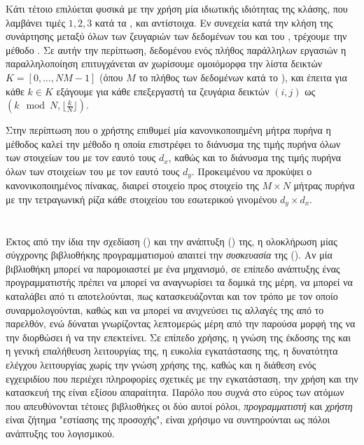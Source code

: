 Κάτι τέτοιο επιλύεται φυσικά με την χρήση μία ιδιωτικής ιδιότητας \texttt{} της κλάσης, που λαμβάνει τιμές $1, 2, 3$ κατά τα \texttt{}, \texttt{} και \texttt{} αντίστοιχα.
Εν συνεχεία κατά την κλήση της συνάρτησης \texttt{} μεταξύ όλων των ζευγαριών των δεδομένων του \texttt{} και του \texttt{}, τρέχουμε την μέθοδο \texttt{}.
Σε αυτήν την περίπτωση, δεδομένου ενός πλήθος παράλληλων εργασιών \texttt{} η παραλληλοποίηση επιτυγχάνεται αν χωρίσουμε ομοιόμορφα την λίστα δεικτών $K = [0, \dots, Ν Μ - 1]$ (όπου $Μ$ το πλήθος των δεδομένων κατά το \texttt{}), και έπειτα για κάθε $k \in K$ εξάγουμε για κάθε επεξεργαστή τα ζευγάρια δεικτών $(i,j)$ ως $(k\mod N, \lfloor \frac{k}{N} \rfloor)$.\par
Στην περίπτωση που ο χρήστης επιθυμεί μία κανονικοποιημένη μήτρα πυρήνα η μέθοδος \texttt{} καλεί την μέθοδο \texttt{} η οποία επιστρέφει το διάνυσμα της τιμής πυρήνα όλων των στοιχείων του \texttt{} με τον εαυτό τους $d_{x}$, καθώς και το διάνυσμα της τιμής πυρήνα όλων των στοιχείων του \texttt{} με τον εαυτό τους $d_{y}$.
Προκειμένου να προκύψει ο κανονικοποιημένος πίνακας, διαιρεί στοιχείο προς στοιχείο της $Μ \times N$ μήτρας πυρήνα με την τετραγωνική ρίζα κάθε στοιχείου του εσωτερικού γινομένου $d_{y} \times d_{x}$.


\section{}
Έκτος από την ίδια την σχεδίαση () και την ανάπτυξη () της, η ολοκλήρωση μίας σύγχρονης βιβλιοθήκης προγραμματισμού απαιτεί την \textit{συσκευασία} της ().
Αν μία βιβλιοθήκη μπορεί να παρομοιαστεί με ένα μηχανισμό, σε επίπεδο ανάπτυξης ένας προγραμματιστής πρέπει να μπορεί να αναγνωρίσει τα δομικά της μέρη, να μπορεί να καταλάβει από τι αποτελούνται, πως κατασκευάζονται και τον τρόπο με τον οποίο συναρμολογούνται, καθώς και να μπορεί να ανιχνεύσει τις αλλαγές της από το παρελθόν, ενώ δύναται γνωρίζοντας λεπτομερώς μέρη από την παρούσα μορφή της να την διορθώσει ή να την επεκτείνει.
Σε επίπεδο χρήσης, η γνώση της έκδοσης της και η γενική επαλήθευση λειτουργίας της, η ευκολία εγκατάστασης της, η δυνατότητα ελέγχου λειτουργίας χωρίς την γνώση χρήσης της, καθώς και η διάθεση ενός εγχειριδίου που περιέχει πληροφορίες σχετικές με την εγκατάσταση, την χρήση και την κατασκευή της είναι εξίσου απαραίτητα.
Παρόλο που συχνά στο εύρος των ατόμων που απευθύνονται τέτοιες βιβλιοθήκες οι δύο αυτοί ρόλοι, \textit{προγραμματιστή} και \textit{χρήστη} είναι ζήτημα "εστίασης της προσοχής", είναι χρήσιμο να συντηρούνται ως πόλοι ανάπτυξης του λογισμικού.
